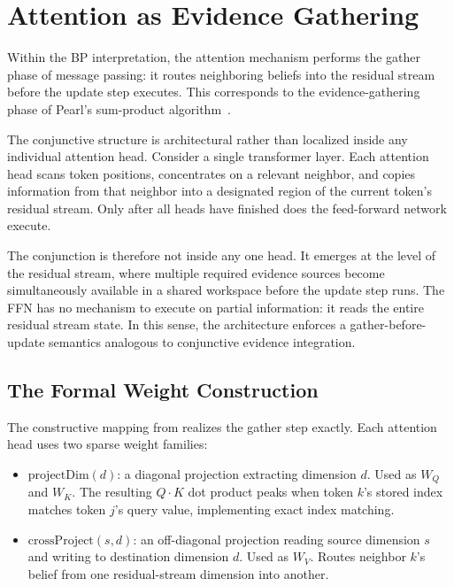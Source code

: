 \section{Attention as Evidence Gathering}
\label{sec:attention-and}

Within the BP interpretation, the attention mechanism performs the
gather phase of message passing: it routes neighboring beliefs into the
residual stream before the update step executes. This corresponds to the
evidence-gathering phase of Pearl's sum-product
algorithm~\cite{pearl1988probabilistic}.

The conjunctive structure is architectural rather than localized inside
any individual attention head. Consider a single transformer layer. Each
attention head scans token positions, concentrates on a relevant
neighbor, and copies information from that neighbor into a designated
region of the current token's residual stream. Only after all heads have
finished does the feed-forward network execute.

The conjunction is therefore not inside any one head. It emerges at the
level of the residual stream, where multiple required evidence sources
become simultaneously available in a shared workspace before the update
step runs. The FFN has no mechanism to execute on partial information:
it reads the entire residual stream state. In this sense, the
architecture enforces a gather-before-update semantics analogous to
conjunctive evidence integration.

\subsection*{The Formal Weight Construction}

The constructive mapping from
\cite{coppola2026transformers} realizes the gather step exactly. Each
attention head uses two sparse weight families:

\begin{itemize}
\item $\mathrm{projectDim}(d)$: a diagonal projection extracting
dimension $d$. Used as $W_Q$ and $W_K$. The resulting $Q \cdot K$ dot
product peaks when token $k$'s stored index matches token $j$'s query
value, implementing exact index matching.

\item $\mathrm{crossProject}(s, d)$: an off-diagonal projection reading
source dimension $s$ and writing to destination dimension $d$. Used as
$W_V$. Routes neighbor $k$'s belief from one residual-stream dimension
into another.
\end{itemize}

